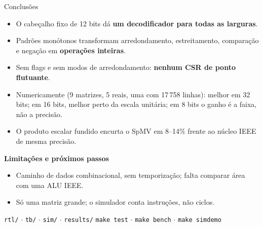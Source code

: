 \documentclass[aspectratio=169,10pt]{beamer}
\newcommand{\code}[1]{\texttt{#1}}
\begin{document}
\begin{frame}{Conclusões}
  \begin{itemize}
    \item O cabeçalho fixo de 12 bits dá \textbf{um decodificador para todas as larguras}.
    \item Padrões monótonos transformam arredondamento, estreitamento, comparação e negação em
          \textbf{operações inteiras}.
    \item Sem flags e sem modos de arredondamento: \textbf{nenhum CSR de ponto flutuante}.
    \item Numericamente (9 matrizes, 5 reais, uma com 17\,758 linhas): melhor em 32 bits; em 16 bits, melhor perto da escala
          unitária; em 8 bits o ganho é a faixa, não a precisão.
    \item O produto escalar fundido encurta o SpMV em 8--14\% frente ao núcleo IEEE de mesma precisão.
  \end{itemize}
  \vspace{2mm}
  \textbf{Limitações e próximos passos}
  \begin{itemize}
    \item Caminho de dados combinacional, sem temporização; falta comparar área com uma ALU IEEE.
    \item Só uma matriz grande; o simulador conta instruções, não ciclos.
  \end{itemize}
  \vfill
  \footnotesize \code{rtl/} \;$\cdot$\; \code{tb/} \;$\cdot$\; \code{sim/} \;$\cdot$\; \code{results/} \qquad \code{make test} \;$\cdot$\; \code{make bench} \;$\cdot$\; \code{make simdemo}
\end{frame}
\end{document}
